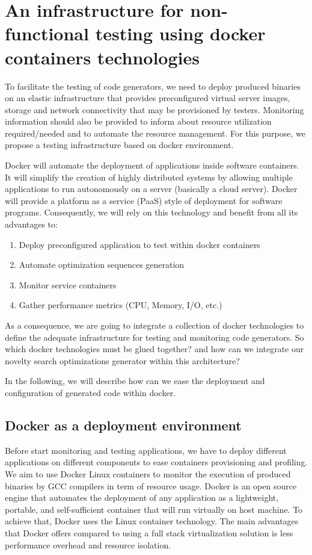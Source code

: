 \section{An infrastructure for non-functional testing using docker containers
technologies}

To facilitate the testing of code generators, we need to deploy produced binaries on an elastic infrastructure that
provides preconfigured virtual server images, storage and network connectivity that may be
provisioned by testers. Monitoring information should also be provided to inform about resource utilization required/needed and to automate the resource management. For this purpose, we propose a testing infrastructure based on docker environment. 

Docker will automate the deployment of applications inside software containers. It will simplify the creation
of highly distributed systems by allowing multiple applications to run autonomously on a server
(basically a cloud server). Docker will provide a platform as a service (PaaS) style of
deployment for software programs. Consequently, we will rely on this technology and benefit from all its advantages to:
\begin{enumerate}
	\item Deploy preconfigured application to test within docker containers
	\item Automate optimization sequences generation
	\item Monitor service containers
	\item Gather performance metrics (CPU, Memory, I/O, etc.)
\end{enumerate}
As a consequence, we are going to integrate a collection of docker technologies to define the adequate infrastructure for testing and monitoring code generators. So which docker technologies must be glued together? and how can we integrate our novelty search optimizations generator within this architecture?

In the following,  we will describe how can we ease the deployment and configuration of generated code within docker.
\subsection{Docker as a deployment environment}
Before start monitoring and testing applications, we have to deploy different applications on different components to ease containers provisioning and profiling.
We aim to use Docker Linux containers to monitor the execution of produced binaries by GCC compilers in term of resource usage. 
Docker is an open source engine that automates the deployment of any application as a
lightweight, portable, and self-sufficient container that will run virtually on host machine. To achieve that, Docker uses the Linux container technology. The main advantages that Docker offers compared to using a full stack virtualization solution is less performance overhead and resource isolation.

